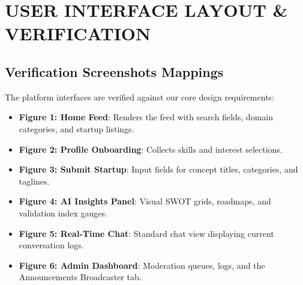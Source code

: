 \documentclass[12pt,a4paper]{report}
\begin{document}
\chapter{USER INTERFACE LAYOUT \& VERIFICATION}

\section{Verification Screenshots Mappings}
The platform interfaces are verified against our core design requirements:
\begin{itemize}
    \item \textbf{Figure 1: Home Feed}: Renders the feed with search fields, domain categories, and startup listings.
    \item \textbf{Figure 2: Profile Onboarding}: Collects skills and interest selections.
    \item \textbf{Figure 3: Submit Startup}: Input fields for concept titles, categories, and taglines.
    \item \textbf{Figure 4: AI Insights Panel}: Visual SWOT grids, roadmaps, and validation index gauges.
    \item \textbf{Figure 5: Real-Time Chat}: Standard chat view displaying current conversation logs.
    \item \textbf{Figure 6: Admin Dashboard}: Moderation queues, logs, and the Announcements Broadcaster tab.
\end{itemize}

\end{document}
